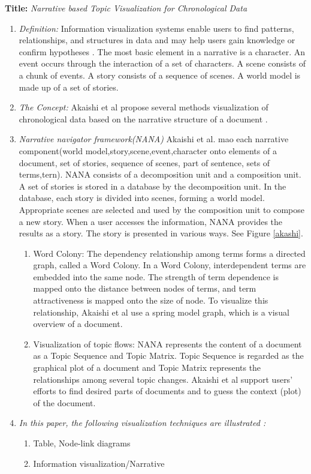 \documentclass{egpubl}
\begin{document}
\textbf{Title:} \textit{Narrative based Topic Visualization for Chronological Data}
\begin{enumerate}
\item \textit{Definition:} Information visualization systems enable users to find patterns, relationships, and structures in data and may help
users gain knowledge or confirm hypotheses \cite{akaishi2007narrative}.  The most basic element in a narrative is a character.
An event occurs through the interaction of a set of characters. A scene consists of a chunk of events. A story consists of a sequence of scenes. A world model is made up of a set of stories.
\item \textit{The Concept:} Akaishi et al propose several methods visualization of chronological data based on the narrative structure of a document \cite{akaishi2007narrative}.
\item \textit{Narrative navigator framework(NANA)}
Akaishi et al. mao each narrative component(world model,story,scene,event,character onto elements of a document, set of stories, sequence of scenes, part of sentence, sets of terms,tern). NANA consists of a decomposition unit and a composition unit. A set of stories is stored in a database by the decomposition unit. In the database, each story is divided into scenes, forming a world model. Appropriate scenes are selected and used by the composition unit to compose a new story. When a user accesses the information, NANA provides the results as a story. The story is presented in various ways. See Figure \ref{akashi}.
\begin{enumerate}
\item Word Colony: The dependency relationship among terms forms a directed graph, called a Word Colony. In a Word Colony, interdependent terms are embedded into the same node. The strength of term dependence is mapped onto the distance between nodes of terms, and term attractiveness is mapped onto the size of node. To visualize this relationship, Akaishi et al use a spring model graph, which is a visual overview of a document.
\item Visualization of topic flows: NANA represents the content of a document as a Topic Sequence and Topic Matrix. Topic Sequence is regarded as
the graphical plot of a document and Topic Matrix represents the relationships among several topic changes. Akaishi et al support users' efforts to find desired parts of documents and to guess the context (plot) of the document.
\end{enumerate}
\item \textit{In this paper, the following visualization techniques are illustrated :} 
\begin{enumerate}
\item Table, Node-link diagrams
\item Information visualization/Narrative
\end{enumerate}
\end{enumerate}
\end{document}
